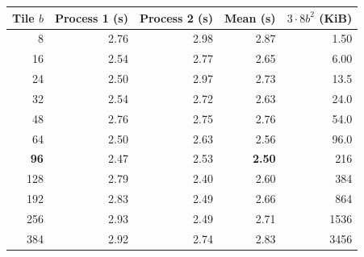 \begin{tabular}{rrrrr}
\toprule
Tile $b$ & Process 1 (s) & Process 2 (s) & Mean (s) & $3\cdot8b^2$ (KiB) \\
\midrule
8 & 2.76 & 2.98 & 2.87 & 1.50 \\
16 & 2.54 & 2.77 & 2.65 & 6.00 \\
24 & 2.50 & 2.97 & 2.73 & 13.5 \\
32 & 2.54 & 2.72 & 2.63 & 24.0 \\
48 & 2.76 & 2.75 & 2.76 & 54.0 \\
64 & 2.50 & 2.63 & 2.56 & 96.0 \\
\textbf{96} & 2.47 & 2.53 & \textbf{2.50} & 216 \\
128 & 2.79 & 2.40 & 2.60 & 384 \\
192 & 2.83 & 2.49 & 2.66 & 864 \\
256 & 2.93 & 2.49 & 2.71 & 1536 \\
384 & 2.92 & 2.74 & 2.83 & 3456 \\
\bottomrule
\end{tabular}
